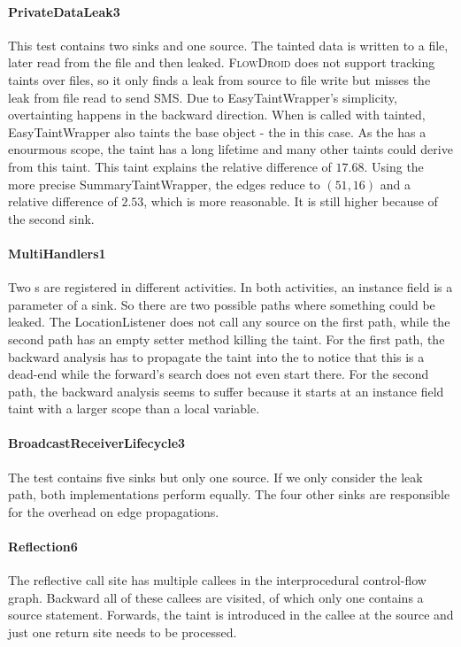 \documentclass[../draft.tex]{subfiles}
\begin{document}
    \paragraph{PrivateDataLeak3} 
    This test contains two sinks and one source. The tainted data is written to a file, later read from the file and then leaked. \textsc{FlowDroid} does not support tracking taints over files, so it only finds a leak from source to file write but misses the leak from file read to send SMS. 
    Due to EasyTaintWrapper's simplicity, overtainting happens in the backward direction. When 
    is called with  tainted, EasyTaintWrapper also taints the base object - the  in this case. As the  has a enourmous scope, the taint has a long lifetime and many other taints could derive from this taint. This taint explains the relative difference of $17.68$.
    Using the more precise SummaryTaintWrapper, the edges reduce to $(51, 16)$ and a relative difference of $2.53$, which is more reasonable. It is still higher because of the second sink. 

    \paragraph{MultiHandlers1}
    Two s are registered in different activities. In both activities, an instance field is a parameter of a sink.
    So there are two possible paths where something could be leaked. The LocationListener does not call any source on the first path, while the second path has an empty setter method killing the taint.
    For the first path, the backward analysis has to propagate the taint into the  to notice that this is a dead-end while the forward's search does not even start there.
    For the second path, the backward analysis seems to suffer because it starts at an instance field taint with a larger scope than a local variable.

    \paragraph{BroadcastReceiverLifecycle3}
    The test contains five sinks but only one source. If we only consider the leak path, both implementations perform equally. 
    The four other sinks are responsible for the overhead on edge propagations.
    
    \paragraph{Reflection6}
    The reflective call site has multiple callees in the interprocedural control-flow graph. Backward all of these callees are visited, of which only one contains a source statement. Forwards, the taint is introduced in the callee at the source and just one return site needs to be processed.
\end{document}
